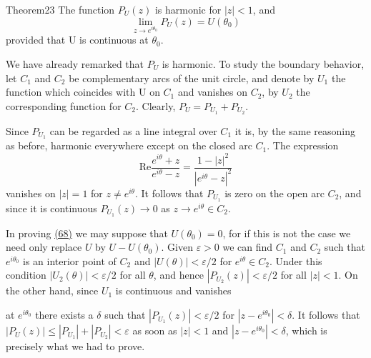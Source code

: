 \begin{originalstatement}{Theorem}{23}\label{thm:4.23}
The function $P_U(z)$ is harmonic for $|z| < 1$, and
\begin{equation*}
\lim _ {z \rightarrow e ^ {i \theta_ {0}}} P _ {U} (z) = U (\theta_ {0})\tag{68}\label{eq:4.68}
\end{equation*}
provided that U is continuous at $\theta_{0}$.

\end{originalstatement}
We have already remarked that $P_{U}$ is harmonic. To study the boundary behavior, let $C_{1}$ and $C_{2}$ be complementary arcs of the unit circle, and denote by $U_{1}$ the function which coincides with U on $C_{1}$ and vanishes on $C_{2}$, by $U_{2}$ the corresponding function for $C_{2}$. Clearly, $P_{U} = P_{U_{1}} + P_{U_{2}}$.

Since $P_{U_{1}}$ can be regarded as a line integral over $C_{1}$ it is, by the same reasoning as before, harmonic everywhere except on the closed arc $C_{1}$. The expression
\begin{equation*}
\mathrm{Re} \frac {e ^ {i \theta} + z}{e ^ {i \theta} - z} = \frac {1 - | z | ^ {2}}{| e ^ {i \theta} - z | ^ {2}}
\end{equation*}
vanishes on $|z| = 1$ for $z \neq e^{i\theta}$. It follows that $P_{U_1}$ is zero on the open arc $C_2$, and since it is continuous $P_{U_1}(z) \to 0$ as $z \to e^{i\theta} \in C_2$.

In proving \hyperref[eq:4.68]{(68)} we may suppose that $U(\theta_0) = 0$, for if this is not the case we need only replace $U$ by $U - U(\theta_0)$. Given $\varepsilon > 0$ we can find $C_1$ and $C_2$ such that $e^{i\theta_0}$ is an interior point of $C_2$ and $|U(\theta)| < \varepsilon / 2$ for $e^{i\theta} \in C_2$. Under this condition $|U_2(\theta)| < \varepsilon / 2$ for all $\theta$, and hence $|P_{U_2}(z)| < \varepsilon / 2$ for all $|z| < 1$. On the other hand, since $U_1$ is continuous and vanishes


at $e^{i\theta_0}$ there exists a $\delta$ such that $|P_{U_1}(z)| < \varepsilon / 2$ for $|z - e^{i\theta_0}| < \delta$. It follows that $|P_U(z)| \leq |P_{U_1}| + |P_{U_2}| < \varepsilon$ as soon as $|z| < 1$ and $|z - e^{i\theta_0}| < \delta$, which is precisely what we had to prove.

